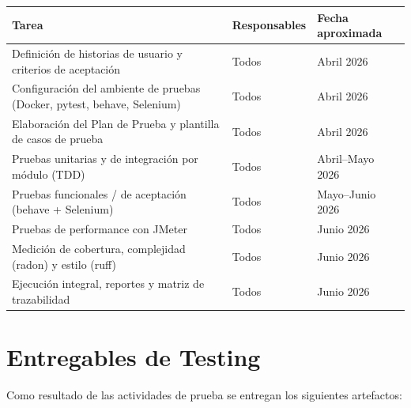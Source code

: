 \documentclass[12pt,letterpaper]{report}
\begin{document}
\begin{center}
\renewcommand{\arraystretch}{1.4}
\begin{tabularx}{\textwidth}{|X|C{2.6cm}|C{3.2cm}|}
\hline
{}
\textbf{Tarea} & \textbf{Responsables} & \textbf{Fecha aproximada} \\
\hline
Definición de historias de usuario y criterios de aceptación & Todos & Abril 2026 \\
\hline
Configuración del ambiente de pruebas (Docker, pytest, behave, Selenium) & Todos & Abril 2026 \\
\hline
Elaboración del Plan de Prueba y plantilla de casos de prueba & Todos & Abril 2026 \\
\hline
Pruebas unitarias y de integración por módulo (TDD) & Todos & Abril--Mayo 2026 \\
\hline
Pruebas funcionales / de aceptación (behave + Selenium) & Todos & Mayo--Junio 2026 \\
\hline
Pruebas de performance con JMeter & Todos & Junio 2026 \\
\hline
Medición de cobertura, complejidad (radon) y estilo (ruff) & Todos & Junio 2026 \\
\hline
Ejecución integral, reportes y matriz de trazabilidad & Todos & Junio 2026 \\
\hline
\end{tabularx}
\end{center}

\chapter{Entregables de Testing}

Como resultado de las actividades de prueba se entregan los siguientes
artefactos:
\end{document}
